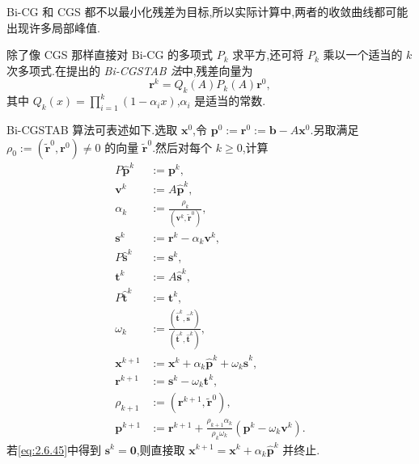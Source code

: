 Bi-CG 和 CGS 都不以最小化残差为目标,所以实际计算中,两者的收敛曲线都可能出现许多局部峰值.

除了像 CGS 那样直接对 Bi-CG 的多项式 \(P_k\) 求平方,还可将 \(P_k\) 乘以一个适当的 \(k\) 次多项式.在提出的 \emph{Bi-CGSTAB 法}中,残差向量为
\[
  \boldsymbol{r}^k=Q_k(A)P_k(A)\boldsymbol{r}^0,
\]
其中 \(Q_k(x)=\prod_{i=1}^k(1-\alpha_i x)\),\(\alpha_i\) 是适当的常数.

Bi-CGSTAB 算法可表述如下.选取 \(\boldsymbol{x}^0\),令 \(\boldsymbol{p}^0:=\boldsymbol{r}^0:=\boldsymbol{b}-A\boldsymbol{x}^0\).另取满足 \(\rho_0:=(\widetilde{\boldsymbol{r}}^0,\boldsymbol{r}^0)\ne0\) 的向量 \(\widetilde{\boldsymbol{r}}^0\).然后对每个 \(k\ge0\),计算
\begin{align}
  P\widehat{\boldsymbol{p}}^k&:=\boldsymbol{p}^k,\label{eq:2.6.42}\\
  \boldsymbol{v}^k&:=A\widehat{\boldsymbol{p}}^k,\label{eq:2.6.43}\\
  \alpha_k&:=\frac{\rho_k}{(\boldsymbol{v}^k,\widetilde{\boldsymbol{r}}^0)},\label{eq:2.6.44}\\
  \boldsymbol{s}^k&:=\boldsymbol{r}^k-\alpha_k\boldsymbol{v}^k,\label{eq:2.6.45}\\
  P\widehat{\boldsymbol{s}}^k&:=\boldsymbol{s}^k,\label{eq:2.6.46}\\
  \boldsymbol{t}^k&:=A\widehat{\boldsymbol{s}}^k,\label{eq:2.6.47}\\
  P\widehat{\boldsymbol{t}}^k&:=\boldsymbol{t}^k,\label{eq:2.6.48}\\
  \omega_k&:=\frac{(\widehat{\boldsymbol{t}}^k,\widehat{\boldsymbol{s}}^k)}
                     {(\widehat{\boldsymbol{t}}^k,\widehat{\boldsymbol{t}}^k)},\label{eq:2.6.49}\\
  \boldsymbol{x}^{k+1}&:=\boldsymbol{x}^k+\alpha_k\widehat{\boldsymbol{p}}^k+\omega_k\widehat{\boldsymbol{s}}^k,\label{eq:2.6.50}\\
  \boldsymbol{r}^{k+1}&:=\boldsymbol{s}^k-\omega_k\boldsymbol{t}^k,\label{eq:2.6.51}\\
  \rho_{k+1}&:=(\boldsymbol{r}^{k+1},\widetilde{\boldsymbol{r}}^0),\label{eq:2.6.52}\\
  \boldsymbol{p}^{k+1}&:=\boldsymbol{r}^{k+1}+
       \frac{\rho_{k+1}\alpha_k}{\rho_k\omega_k}(\boldsymbol{p}^k-\omega_k\boldsymbol{v}^k).\label{eq:2.6.53}
\end{align}
若\eqref{eq:2.6.45}中得到 \(\boldsymbol{s}^k=\boldsymbol{0}\),则直接取 \(\boldsymbol{x}^{k+1}=\boldsymbol{x}^k+\alpha_k\widehat{\boldsymbol{p}}^k\) 并终止.

